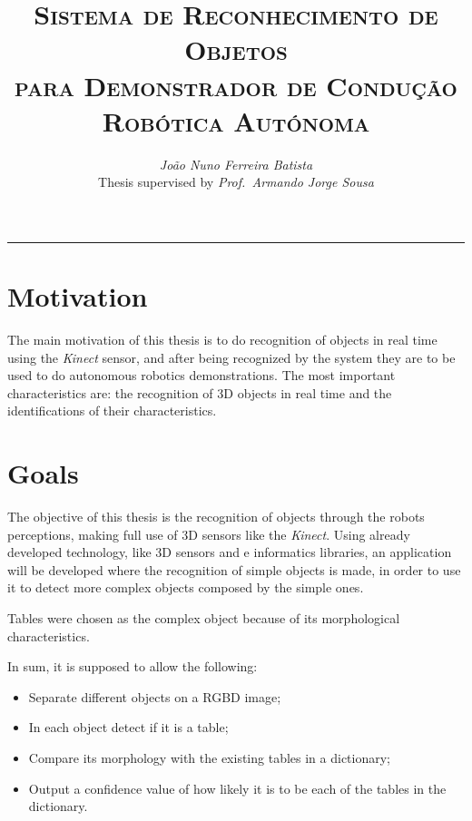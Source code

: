 \documentclass[9pt,a4paper]{extarticle}
\begin{document}
\title{\vspace*{-8mm}\textbf{\textsc{Sistema de Reconhecimento de Objetos\\
para Demonstrador de Condução Robótica Autónoma}}}
\author{\emph{João Nuno Ferreira Batista}\\[2mm]
\small{Thesis supervised by \emph{Prof.\ Armando Jorge Sousa}}}
\date{}
\maketitle
\thispagestyle{empty}

\vspace*{-4mm}\noindent\rule{\textwidth}{0.4pt}\vspace*{4mm}

\begin{multicols}{2}

\section{Motivation}\label{sec:motiva}

The main motivation of this thesis is to do recognition of objects in real time using the
\emph{Kinect} sensor, and after being recognized by the system they are to be used to do autonomous
robotics demonstrations. The most important characteristics are: the recognition of 3D objects in
real time and the identifications of their characteristics.

\section{Goals}\label{sec:goals}

The objective of this thesis is the recognition of objects through the robots perceptions, making
full use of 3D sensors like the \emph{Kinect}. Using already developed technology, like 3D sensors
and e informatics libraries, an application will be developed where the recognition of simple objects
is made, in order to use it to detect more complex objects composed by the simple ones.

Tables were chosen as the complex object because of its morphological characteristics.

In sum, it is supposed to allow the following:
\begin{itemize}
\item Separate different objects on a RGBD image;
\item In each object detect if it is a table;
\item Compare its morphology with the existing tables in a dictionary;
\item Output a confidence value of how likely it is to be each of the tables in the dictionary.
\end{itemize}


\end{multicols}
\end{document}
